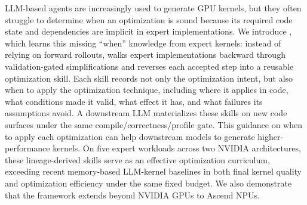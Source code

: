 
LLM-based agents are increasingly used to generate GPU kernels, but they often struggle to determine when an optimization is sound because its required code state and dependencies are implicit in expert implementations. We introduce \sys, which learns this missing ``when'' knowledge from expert kernels: instead of relying on forward rollouts, \sys walks expert implementations backward through validation-gated simplifications and reverses each accepted step into a reusable optimization skill. Each skill records not only the optimization intent, but also when to apply the optimization technique, including where it applies in code, what conditions made it valid, what effect it has, and what failures its assumptions avoid. A downstream LLM materializes these skills on new code surfaces under the same compile/correctness/profile gate. This guidance on when to apply each optimization can help downstream models to generate higher-performance kernels.    
On five expert workloads across two NVIDIA architectures, these lineage-derived skills serve as an effective optimization curriculum, exceeding recent memory-based LLM-kernel baselines in both final kernel quality and optimization efficiency under the same fixed budget. 
We also demonstrate that the \sys framework extends beyond NVIDIA GPUs to Ascend NPUs.
